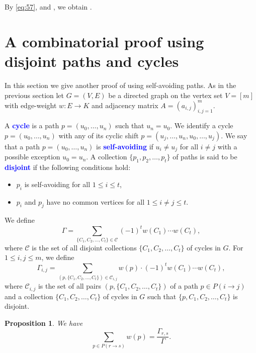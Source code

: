 \documentclass[oneside]{book}
\numberwithin{equation}{section}
\newtheorem{prop}[thm]{Proposition}
\theoremstyle{definition}
\renewcommand\emph[1]{\textcolor{blue}{\bf #1}}
\begin{document}
By \eqref{eq:57},  and , we
obtain .

\section{A combinatorial proof using disjoint paths and cycles}

In this section we give another proof of  using
self-avoiding paths. As in the previous section let \( G=(V,E) \) be a
directed graph on the vertex set \( V=[m] \) with edge-weight
\( w:E\to K \) and adjacency matrix \( A = (a_{i,j})_{i,j=1}^m \).

A \emph{cycle} is a path \( p=(u_0,\dots,u_n) \) such that
\( u_n=u_0 \). We identify a cycle \( p=(u_0,\dots,u_n) \) with any of
its cyclic shift \( p=(u_j,\dots,u_n,u_0,\dots,u_j) \). We say that a
path \( p=(u_0,\dots,u_n) \) is \emph{self-avoiding} if
\( u_i\ne u_j \) for all \( i\ne j \) with a possible exception
\( u_0=u_n \). A collection \( \{p_1, p_2,\dots,p_t\} \) of paths is
said to be \emph{disjoint} if the following conditions hold:
\begin{itemize}
\item \( p_i \) is self-avoiding for all \( 1\le i\le t \),
\item \( p_i \) and \( p_j \) have no common vertices for all
  \( 1\le i\ne j\le t \).
\end{itemize}


We define
\begin{equation}\label{eq:66}
  \Gamma = \sum_{\{C_1, C_2,\dots,C_t\}\in \mathcal{C}} (-1)^{t} w(C_1) \cdots w(C_t),
\end{equation}
where \( \mathcal{C} \) is the set of all disjoint collections
\( \{C_1, C_2,\dots,C_t\} \) of cycles in \( G \). For
\( 1\le i,j\le m \), we define
\begin{equation}\label{eq:61}
  \Gamma_{i,j} = \sum_{(p,\{C_1, C_2,\dots,C_t\})\in \mathcal{C}_{i,j}} w(p) \cdot (-1)^{t} w(C_1) \cdots w(C_t),
\end{equation}
where \( \mathcal{C}_{i,j} \) is the set of all pairs
\( (p,\{C_1, C_2,\dots,C_t\}) \) of a path \( p\in P(i\to j) \) and a
collection \( \{C_1, C_2,\dots,C_t\} \) of cycles in \( G \) such that
\( \{p, C_1, C_2,\dots,C_t\} \) is disjoint.

\begin{prop}\label{pro:3}
  We have
\[
  \sum_{p\in P(r\to s)}  w(p) = \frac{\Gamma_{r,s}}{\Gamma}.
\]
\end{prop}
\end{document}
